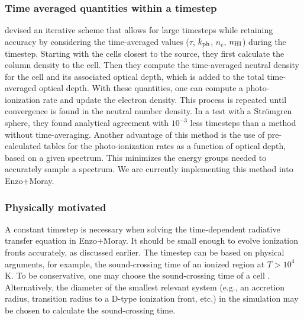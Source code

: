 \documentclass[useAMS,usenatbib]{mn2e}
\begin{document}
\subsubsection{Time averaged quantities within a timestep}

\citet{Mellema06} devised an iterative scheme that allows for large
timesteps while retaining accuracy by considering the time-averaged
values ($\tau$, $k_{\rm ph}$, $n_e$, $n_{\rm HI}$) during the
timestep.  Starting with the cells closest to the source, they first
calculate the column density to the cell.  Then they compute the
time-averaged neutral density for the cell and its associated optical
depth, which is added to the total time-averaged optical depth.  With
these quantities, one can compute a photo-ionization rate and update
the electron density.  This process is repeated until convergence is
found in the neutral number density.  In a test with a Str\"{o}mgren
sphere, they found analytical agreement with $10^{-3}$ less timesteps
than a method without time-averaging.  Another advantage of this
method is the use of pre-calculated tables for the photo-ionization
rates as a function of optical depth, based on a given spectrum.  This
minimizes the energy groups needed to accurately sample a spectrum.
We are currently implementing this method into Enzo+Moray.

\subsubsection{Physically motivated}
\label{sec:dt_const}

A constant timestep is necessary when solving the time-dependent
radiative transfer equation in Enzo+Moray.  It should be small enough
to evolve ionization fronts accurately, as discussed earlier.  The
timestep can be based on physical arguments, for example, the
sound-crossing time of an ionized region at $T > 10^4$ K.  To be
conservative, one may choose the sound-crossing time of a cell
\citep[e.g.][]{Abel07, Wise08_Gal}.  Alternatively, the diameter of
the smallest relevant system (e.g., an accretion radius, transition
radius to a D-type ionization front, etc.) in the simulation may be
chosen to calculate the sound-crossing time.
\end{document}

